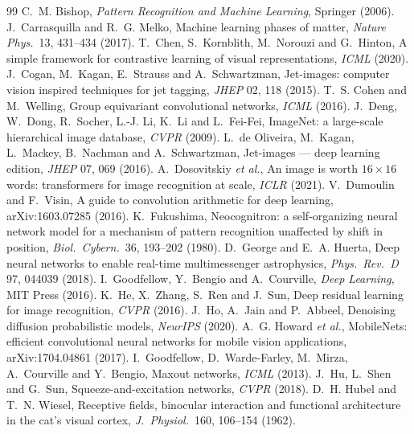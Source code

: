 \documentclass[11pt]{article}
\begin{document}
\begin{thebibliography}{99}\small
{} C.~M. Bishop, \emph{Pattern Recognition and Machine Learning}, Springer (2006).
 J.~Carrasquilla and R.~G. Melko, Machine learning phases of matter, \emph{Nature Phys.}\ 13, 431--434 (2017).
 T.~Chen, S.~Kornblith, M.~Norouzi and G.~Hinton, A simple framework for contrastive learning of visual representations, \emph{ICML} (2020).
 J.~Cogan, M.~Kagan, E.~Strauss and A.~Schwartzman, Jet-images: computer vision inspired techniques for jet tagging, \emph{JHEP} 02, 118 (2015).
 T.~S. Cohen and M.~Welling, Group equivariant convolutional networks, \emph{ICML} (2016).
 J.~Deng, W.~Dong, R.~Socher, L.-J. Li, K.~Li and L.~Fei-Fei, ImageNet: a large-scale hierarchical image database, \emph{CVPR} (2009).
 L.~de Oliveira, M.~Kagan, L.~Mackey, B.~Nachman and A.~Schwartzman, Jet-images --- deep learning edition, \emph{JHEP} 07, 069 (2016).
 A.~Dosovitskiy \emph{et al.}, An image is worth $16 \times 16$ words: transformers for image recognition at scale, \emph{ICLR} (2021).
 V.~Dumoulin and F.~Visin, A guide to convolution arithmetic for deep learning, arXiv:1603.07285 (2016).
 K.~Fukushima, Neocognitron: a self-organizing neural network model for a mechanism of pattern recognition unaffected by shift in position, \emph{Biol.\ Cybern.}\ 36, 193--202 (1980).
 D.~George and E.~A. Huerta, Deep neural networks to enable real-time multimessenger astrophysics, \emph{Phys.\ Rev.\ D} 97, 044039 (2018).
 I.~Goodfellow, Y.~Bengio and A.~Courville, \emph{Deep Learning}, MIT Press (2016).
 K.~He, X.~Zhang, S.~Ren and J.~Sun, Deep residual learning for image recognition, \emph{CVPR} (2016).
 J.~Ho, A.~Jain and P.~Abbeel, Denoising diffusion probabilistic models, \emph{NeurIPS} (2020).
 A.~G. Howard \emph{et al.}, MobileNets: efficient convolutional neural networks for mobile vision applications, arXiv:1704.04861 (2017).
 I.~Goodfellow, D.~Warde-Farley, M.~Mirza, A.~Courville and Y.~Bengio, Maxout networks, \emph{ICML} (2013).
 J.~Hu, L.~Shen and G.~Sun, Squeeze-and-excitation networks, \emph{CVPR} (2018).
 D.~H. Hubel and T.~N. Wiesel, Receptive fields, binocular interaction and functional architecture in the cat's visual cortex, \emph{J.\ Physiol.}\ 160, 106--154 (1962).

\end{thebibliography}
\end{document}
